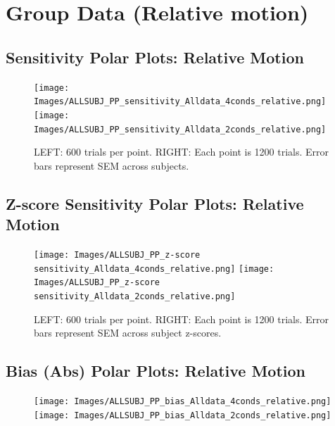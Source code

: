 \documentclass[11pt]{article} %
\begin{document}
\newpage
\section{Group Data (Relative motion)}
\subsection{Sensitivity Polar Plots: Relative Motion}
\begin{figure}[H]
\centering %
\texttt{[image: Images/ALLSUBJ\_PP\_sensitivity\_Alldata\_4conds\_relative.png]}
\texttt{[image: Images/ALLSUBJ\_PP\_sensitivity\_Alldata\_2conds\_relative.png]}
\caption{LEFT: 600 trials per point. RIGHT: Each point is 1200 trials. Error bars represent SEM across subjects.}
\end{figure}
\subsection{Z-score Sensitivity Polar Plots: Relative Motion}
\begin{figure}[H]
\centering %
\texttt{[image: Images/ALLSUBJ\_PP\_z-score sensitivity\_Alldata\_4conds\_relative.png]}
\texttt{[image: Images/ALLSUBJ\_PP\_z-score sensitivity\_Alldata\_2conds\_relative.png]}
\caption{LEFT: 600 trials per point. RIGHT: Each point is 1200 trials. Error bars represent SEM across subject z-scores.}
\end{figure}
\subsection{Bias (Abs) Polar Plots: Relative Motion}
\begin{figure}[H]
\centering %
\texttt{[image: Images/ALLSUBJ\_PP\_bias\_Alldata\_4conds\_relative.png]}
\texttt{[image: Images/ALLSUBJ\_PP\_bias\_Alldata\_2conds\_relative.png]}
\end{figure}
\end{document}
